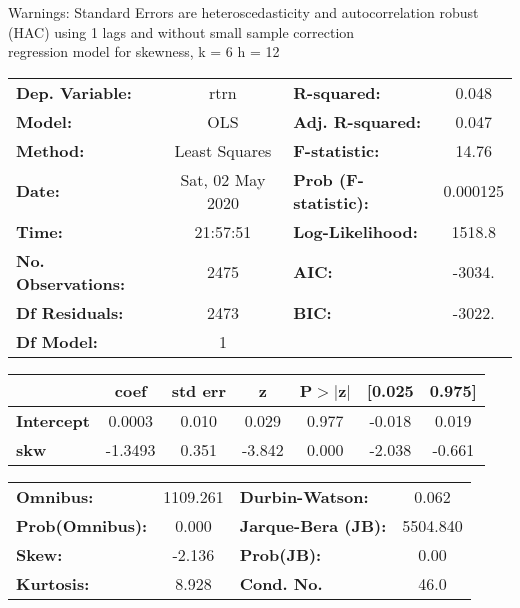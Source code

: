 Warnings: \newline
 [1] Standard Errors are heteroscedasticity and autocorrelation robust (HAC) using 1 lags and without small sample correction\\ 

regression model for skewness, k = 6 h = 12\begin{center}
\begin{tabular}{lclc}
\toprule
\textbf{Dep. Variable:}    &       rtrn       & \textbf{  R-squared:         } &     0.048   \\
\textbf{Model:}            &       OLS        & \textbf{  Adj. R-squared:    } &     0.047   \\
\textbf{Method:}           &  Least Squares   & \textbf{  F-statistic:       } &     14.76   \\
\textbf{Date:}             & Sat, 02 May 2020 & \textbf{  Prob (F-statistic):} &  0.000125   \\
\textbf{Time:}             &     21:57:51     & \textbf{  Log-Likelihood:    } &    1518.8   \\
\textbf{No. Observations:} &        2475      & \textbf{  AIC:               } &    -3034.   \\
\textbf{Df Residuals:}     &        2473      & \textbf{  BIC:               } &    -3022.   \\
\textbf{Df Model:}         &           1      & \textbf{                     } &             \\
\bottomrule
\end{tabular}
\begin{tabular}{lcccccc}
                   & \textbf{coef} & \textbf{std err} & \textbf{z} & \textbf{P$> |$z$|$} & \textbf{[0.025} & \textbf{0.975]}  \\
\midrule
\textbf{Intercept} &       0.0003  &        0.010     &     0.029  &         0.977        &       -0.018    &        0.019     \\
\textbf{skw}       &      -1.3493  &        0.351     &    -3.842  &         0.000        &       -2.038    &       -0.661     \\
\bottomrule
\end{tabular}
\begin{tabular}{lclc}
\textbf{Omnibus:}       & 1109.261 & \textbf{  Durbin-Watson:     } &    0.062  \\
\textbf{Prob(Omnibus):} &   0.000  & \textbf{  Jarque-Bera (JB):  } & 5504.840  \\
\textbf{Skew:}          &  -2.136  & \textbf{  Prob(JB):          } &     0.00  \\
\textbf{Kurtosis:}      &   8.928  & \textbf{  Cond. No.          } &     46.0  \\
\bottomrule
\end{tabular}
\end{center}

